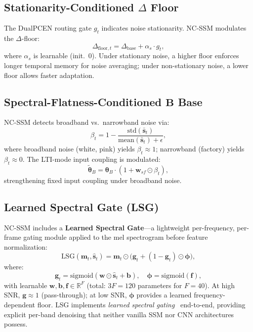 \documentclass[journal]{IEEEtran}
\begin{document}
\subsection{Stationarity-Conditioned $\Delta$ Floor}

The DualPCEN routing gate $g_t$ indicates noise stationarity. NC-SSM modulates the $\Delta$-floor:
\begin{equation}
\Delta_{\text{floor},t} = \Delta_{\text{base}} + \alpha_s \cdot g_t,
\label{eq:station_dt}
\end{equation}
where $\alpha_s$ is learnable (init.~0).
Under stationary noise, a higher floor enforces longer temporal memory for noise averaging; under non-stationary noise, a lower floor allows faster adaptation.

\subsection{Spectral-Flatness-Conditioned $\mathbf{B}$ Base}

NC-SSM detects broadband vs.\ narrowband noise via:
\begin{equation}
\beta_t = 1 - \frac{\text{std}(\bar{\mathbf{s}}_t)}{\text{mean}(\bar{\mathbf{s}}_t) + \epsilon},
\label{eq:broadband}
\end{equation}
where broadband noise (white, pink) yields $\beta_t \approx 1$; narrowband (factory) yields $\beta_t \approx 0$.
The LTI-mode input coupling is modulated:
\begin{equation}
\tilde{\bm{\theta}}_B = \bm{\theta}_B \cdot (1 + \mathbf{w}_{sf} \odot \beta_t),
\label{eq:sf_B}
\end{equation}
strengthening fixed input coupling under broadband noise.

\subsection{Learned Spectral Gate (LSG)}
\label{sec:lsg}

NC-SSM includes a \textbf{Learned Spectral Gate}---a lightweight per-frequency, per-frame gating module applied to the mel spectrogram before feature normalization:
\begin{equation}
\text{LSG}(\mathbf{m}_t, \hat{\mathbf{s}}_t) = \mathbf{m}_t \odot \big(\mathbf{g}_t + (1{-}\mathbf{g}_t) \odot \bm{\phi}\big),
\label{eq:lsg}
\end{equation}
where:
\begin{equation}
\mathbf{g}_t = \text{sigmoid}(\mathbf{w} \odot \hat{\mathbf{s}}_t + \mathbf{b}), \quad
\bm{\phi} = \text{sigmoid}(\mathbf{f}),
\label{eq:lsg_gate}
\end{equation}
with learnable $\mathbf{w}, \mathbf{b}, \mathbf{f} \in \mathbb{R}^F$ (total: $3F = 120$ parameters for $F{=}40$).
At high SNR, $\mathbf{g} \approx 1$ (pass-through); at low SNR, $\bm{\phi}$ provides a learned frequency-dependent floor.
LSG implements \emph{learned spectral gating}~\cite{ephraim1984speech} end-to-end, providing explicit per-band denoising that neither vanilla SSM nor CNN architectures possess.
\end{document}
